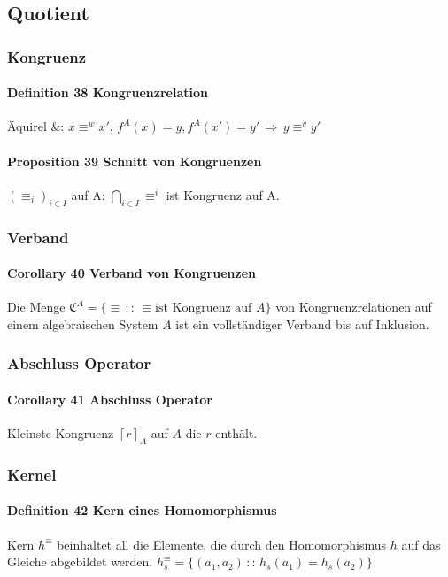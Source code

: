 \subsection{Quotient}

\subsubsection{Kongruenz}

\paragraph{Definition 38 Kongruenzrelation}
Äquirel \&: 
$
x\equiv^{w}x',\, f^{A}(x)=y, f^{A}(x')=y' \, \Rightarrow  \, y\equiv^{v}y'
$

\paragraph{Proposition 39 Schnitt von Kongruenzen}
$\left(\equiv_{i}\right)_{i\in I}$ auf A: $\bigcap_{i\in I}\equiv^{i}$ ist Kongruenz auf A.

\subsubsection{Verband}

\paragraph{Corollary 40 Verband von Kongruenzen}
Die Menge $\mathfrak{C}^{A}=\{\equiv\,::\,\equiv\textrm{ist Kongruenz auf }A\}$
von Kongruenzrelationen auf einem algebraischen System $A$ ist ein vollständiger Verband bis auf Inklusion.

\subsubsection{Abschluss Operator}

\paragraph{Corollary 41 Abschluss Operator}
Kleinste Kongruenz $\left\lceil r\right\rceil _{A}$ auf
$A$ die $r$ enthält.

\subsubsection{Kernel}

\paragraph{Definition 42 Kern eines Homomorphismus}
Kern $h^\equiv$ beinhaltet all die Elemente, die durch den Homomorphismus $h$ auf das Gleiche abgebildet werden.
$h_{s}^{\equiv}=\{(a_{1},a_{2})\,::\, h_{s}(a_{1})=h_{s}(a_{2})\}$

